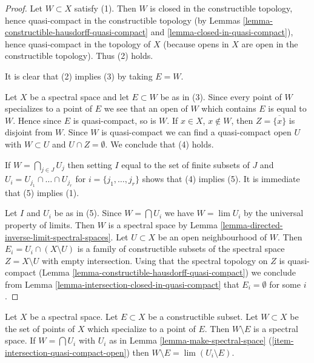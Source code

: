\begin{proof}
Let $W \subset X$ satisfy (1). Then $W$ is closed in the constructible
topology, hence quasi-compact in the constructible topology (by
Lemmas \ref{lemma-constructible-hausdorff-quasi-compact} and
\ref{lemma-closed-in-quasi-compact}), hence quasi-compact in the topology
of $X$ (because opens in $X$ are open in the constructible topology). Thus
(2) holds.

\medskip\noindent
It is clear that (2) implies (3) by taking $E = W$.

\medskip\noindent
Let $X$ be a spectral space and let $E \subset W$ be as in (3).
Since every point of $W$ specializes to a point of $E$ we see that
an open of $W$ which contains $E$ is equal to $W$. Hence since $E$
is quasi-compact, so is $W$.
If $x \in X$, $x \not \in W$, then $Z = \overline{\{x\}}$ is
disjoint from $W$. Since $W$ is quasi-compact we can find a
quasi-compact open $U$ with $W \subset U$ and $U \cap Z = \emptyset$.
We conclude that (4) holds.

\medskip\noindent
If $W = \bigcap_{j \in J} U_j$ then setting $I$ equal to the set of
finite subsets of $J$ and $U_i = U_{j_1} \cap \ldots \cap U_{j_r}$
for $i = \{j_1, \ldots, j_r\}$ shows that (4) implies (5). It is immediate
that (5) implies (1).

\medskip\noindent
Let $I$ and $U_i$ be as in (5).
Since $W = \bigcap U_i$ we have $W = \lim U_i$ by the universal property
of limits. Then $W$ is a spectral space by
Lemma \ref{lemma-directed-inverse-limit-spectral-spaces}.
Let $U \subset X$ be an open neighbourhood of $W$.
Then $E_i = U_i \cap (X \setminus U)$ is a family of constructible
subsets of the spectral space $Z = X \setminus U$
with empty intersection. Using that the spectral topology on $Z$
is quasi-compact (Lemma \ref{lemma-constructible-hausdorff-quasi-compact})
we conclude from
Lemma \ref{lemma-intersection-closed-in-quasi-compact}
that $E_i = \emptyset$ for some $i$.
\end{proof}

\begin{lemma}
\label{lemma-make-spectral-space-minus}
Let $X$ be a spectral space. Let $E \subset X$ be a constructible subset.
Let $W \subset X$ be the set of points of $X$ which specialize
to a point of $E$. Then $W \setminus E$ is a spectral space.
If $W = \bigcap U_i$ with $U_i$ as in
Lemma \ref{lemma-make-spectral-space}
(\ref{item-intersection-quasi-compact-open})
then $W \setminus E = \lim (U_i \setminus E)$.
\end{lemma}

